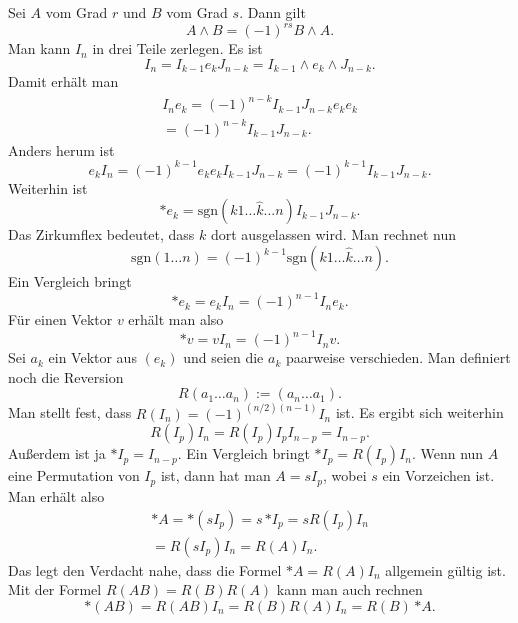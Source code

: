 \documentclass[a4paper,11pt,fleqn,twocolumn,twoside]{scrartcl}
\numberwithin{equation}{section}
\begin{document}
Sei $A$ vom Grad $r$ und $B$ vom Grad $s$. Dann gilt
\begin{equation}
A\wedge B = (-1)^{rs} B\wedge A.
\end{equation}
Man kann $I_n$ in drei Teile zerlegen. Es ist
\begin{equation}
I_n = I_{k-1}e_k J_{n-k} = I_{k-1}\wedge e_k\wedge J_{n-k}.
\end{equation}
Damit erhält man
\begin{gather*}
I_n e_k = (-1)^{n-k} I_{k-1}J_{n-k}e_ke_k\\
= (-1)^{n-k} I_{k-1}J_{n-k}.
\end{gather*}
Anders herum ist
\[e_k I_n =  (-1)^{k-1} e_ke_k I_{k-1}J_{n-k}
= (-1)^{k-1} I_{k-1}J_{n-k}.\]
Weiterhin ist
\begin{equation}
*e_k = \mathrm{sgn}(k1\ldots\hat k\ldots n)I_{k-1}J_{n-k}.
\end{equation}
Das Zirkumflex bedeutet, dass $k$ dort ausgelassen wird.
Man rechnet nun
\begin{equation}
\mathrm{sgn}(1\ldots n) = (-1)^{k-1}
\mathrm{sgn}(k1\ldots\hat k\ldots n).
\end{equation}
Ein Vergleich bringt
\begin{equation}
*e_k = e_k I_n = (-1)^{n-1} I_n e_k.
\end{equation}
Für einen Vektor $v$ erhält man also
\begin{equation}
*v = vI_n = (-1)^{n-1}I_n v.
\end{equation}
Sei $a_k$ ein Vektor aus $(e_k)$ und seien die $a_k$
paarweise verschieden.
Man definiert noch die Reversion
\begin{equation}
R(a_1\ldots a_n) := (a_n\ldots a_1).
\end{equation}
Man stellt fest, dass $R(I_n)=(-1)^{(n/2)(n-1)}I_n$ ist.
Es ergibt sich weiterhin
\begin{equation}
R(I_p)I_n = R(I_p)I_p I_{n-p} = I_{n-p}.
\end{equation}
Außerdem ist ja $*I_p = I_{n-p}$. Ein Vergleich bringt $*I_p = R(I_p)I_n$.
Wenn nun $A$ eine Permutation von $I_p$ ist, dann hat man $A=sI_p$,
wobei $s$ ein Vorzeichen ist. Man erhält also
\begin{gather*}
*A = *(sI_p) = s\,{*I_p} = sR(I_p)I_n\\
= R(sI_p)I_n = R(A)I_n.
\end{gather*}
Das legt den Verdacht nahe, dass die Formel
$*A=R(A)I_n$ allgemein gültig ist.
Mit der Formel $R(AB) = R(B)R(A)$ kann man auch rechnen
\[*(AB) = R(AB)I_n = R(B)R(A)I_n = R(B)\,{*A}.\]
\end{document}
